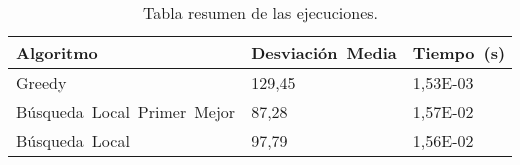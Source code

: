 \begin{table}[!ht]%
    \centering
    \begin{tabular}{|l|l|l|}
        \hline
        \textbf{Algoritmo} & \textbf{Desviación~Media} & \textbf{Tiempo~(s)} \\ \hline
        Greedy & 129,45 & 1,53E-03 \\ \hline
        Búsqueda~Local~Primer~Mejor & 87,28 & 1,57E-02 \\ \hline
        Búsqueda~Local & 97,79 & 1,56E-02 \\ \hline
    \end{tabular}
\caption{Tabla resumen de las ejecuciones.}
\end{table}